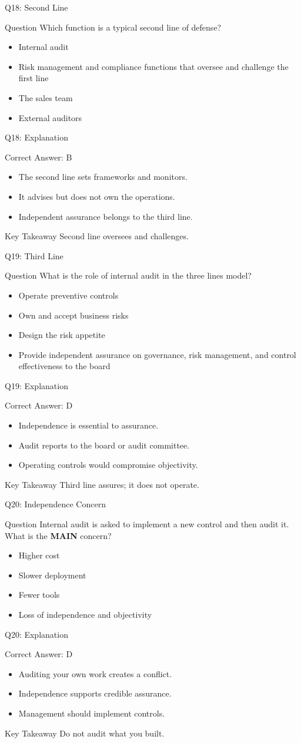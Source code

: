 \documentclass[aspectratio=169]{beamer}
\newcommand{\hq}[7]{%
	\begin{frame}{Q#1: #2}
		\begin{block}{Question}
			#3
		\end{block}
		\begin{itemize}
			#4
		\end{itemize}
	\end{frame}
	\begin{frame}{Q#1: Explanation}
		\begin{block}{Correct Answer: #5}
			\begin{itemize}
				#6
			\end{itemize}
		\end{block}
		\begin{alertblock}{Key Takeaway}
			#7
		\end{alertblock}
	\end{frame}
}
\begin{document}
	\hq{18}{Second Line}
	{Which function is a typical second line of defense?}
	{\item[\textbf{(A)}] Internal audit
		\item[\textbf{(B)}] Risk management and compliance functions that oversee and challenge the first line
		\item[\textbf{(C)}] The sales team
		\item[\textbf{(D)}] External auditors}
	{B}
	{\item The second line sets frameworks and monitors.
		\item It advises but does not own the operations.
		\item Independent assurance belongs to the third line.}
	{Second line oversees and challenges.}
	
	\hq{19}{Third Line}
	{What is the role of internal audit in the three lines model?}
	{\item[\textbf{(A)}] Operate preventive controls
		\item[\textbf{(B)}] Own and accept business risks
		\item[\textbf{(C)}] Design the risk appetite
		\item[\textbf{(D)}] Provide independent assurance on governance, risk management, and control effectiveness to the board}
	{D}
	{\item Independence is essential to assurance.
		\item Audit reports to the board or audit committee.
		\item Operating controls would compromise objectivity.}
	{Third line assures; it does not operate.}
	
	\hq{20}{Independence Concern}
	{Internal audit is asked to implement a new control and then audit it. What is the \textbf{MAIN} concern?}
	{\item[\textbf{(A)}] Higher cost
		\item[\textbf{(B)}] Slower deployment
		\item[\textbf{(C)}] Fewer tools
		\item[\textbf{(D)}] Loss of independence and objectivity}
	{D}
	{\item Auditing your own work creates a conflict.
		\item Independence supports credible assurance.
		\item Management should implement controls.}
	{Do not audit what you built.}
	
\end{document}
